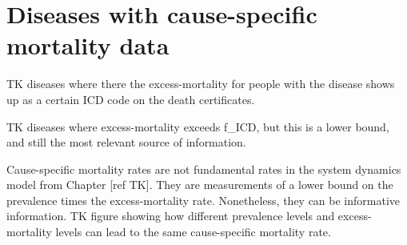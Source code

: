 \section{Diseases with cause-specific mortality data}

TK diseases where there the excess-mortality for people with the
disease shows up as a certain ICD code on the death certificates.

TK diseases where excess-mortality exceeds f_ICD, but this is a lower
bound, and still the most relevant source of information.

Cause-specific mortality rates are not fundamental rates in the system
dynamics model from Chapter [ref TK]. They are measurements of a lower
bound on the prevalence times the excess-mortality rate. Nonetheless,
they can be informative information. TK figure showing how different
prevalence levels and excess-mortality levels can lead to the same
cause-specific mortality rate.
